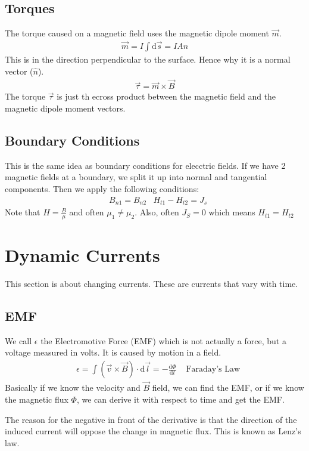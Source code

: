 \documentclass[12pt,letterpaper]{article} \usepackage{amsmath} \usepackage{graphicx} \usepackage[margin=1in]{geometry} \usepackage{longtable}  \usepackage{amssymb}
\begin{document}
	\subsection{Torques}
	The torque caused on a magnetic field uses the magnetic dipole moment $\vec m$.
	\begin{align*}
		\vec m = I\int \mathrm d \vec s = IA\hat n
	\end{align*}
	This is in the direction perpendicular to the surface. Hence why it is a normal vector ($\hat n$).
	\begin{align*}
		\vec \tau = \vec m \times \vec B
	\end{align*}
	The torque $\vec \tau$ is just th ecross product between the magnetic field and the magnetic dipole moment vectors.
	
	\subsection{Boundary Conditions}
	This is the same idea as boundary conditions for elecctric fields. If we have 2 magnetic fields at a boundary, we split it up into normal and tangential components. Then we apply the following conditions:
	\begin{align*}
		&B_{n1} = B_{n2} &H_{t1} - H_{t2} = J_s
	\end{align*}
	Note that $H = \frac{B}{\mu}$ and often $\mu_1 \ne \mu_2$. Also, often $J_S=0$ which means $H_{t1} = H_{t2}$
	
	\section{Dynamic Currents}
	This section is about changing currents. These are currents that vary with time. 
	
	\subsection{EMF}
	We call $\epsilon$ the Electromotive Force (EMF) which is not actually a force, but a voltage measured in volts. It is caused by motion in a field. 
	\begin{align*}
		&\epsilon = \int(\vec v \times \vec B)\cdot \mathrm d \vec l = -\frac{\mathrm d \Phi}{\mathrm d t} &\text{ Faraday's Law}
	\end{align*}
	Basically if we know the velocity and $\vec B$ field, we can find the EMF, or if we know the magnetic flux $\Phi$, we can derive it with respect to time and get the EMF. 
	
	The reason for the negative in front of the derivative is that the direction of the induced current will oppose the change in magnetic flux. This is known as Lenz's law.
	
	
	
	
\end{document}
